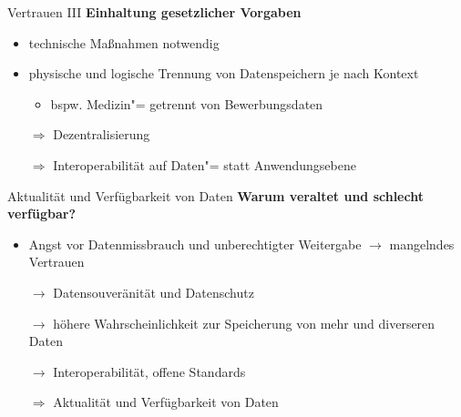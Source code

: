 \begin{frame}{Vertrauen III}
    \textbf{Einhaltung gesetzlicher Vorgaben}
    \begin{itemize}
        \item technische Maßnahmen notwendig

        \pause
        \item physische und logische Trennung von Datenspeichern je nach Kontext
        \begin{itemize}
            \item bspw. Medizin"= getrennt von Bewerbungsdaten
        \end{itemize}

        \pause
        \item[$\Rightarrow$] Dezentralisierung
        \item[$\Rightarrow$] Interoperabilität auf Daten"= statt Anwendungsebene
    \end{itemize}
\end{frame}


\begin{frame}{Aktualität und Verfügbarkeit von Daten}
    \textbf{Warum veraltet und schlecht verfügbar?}
    \begin{itemize}
        \item Angst vor Datenmissbrauch und unberechtigter Weitergabe $\to$ mangelndes Vertrauen

        \pause
        \item[$\to$] Datensouveränität und Datenschutz
        \item[$\to$] höhere Wahrscheinlichkeit zur Speicherung von mehr und diverseren Daten

        \pause
        \item[$\to$] Interoperabilität, offene Standards

        \pause
        \item[$\Rightarrow$] Aktualität und Verfügbarkeit von Daten
    \end{itemize}
\end{frame}


